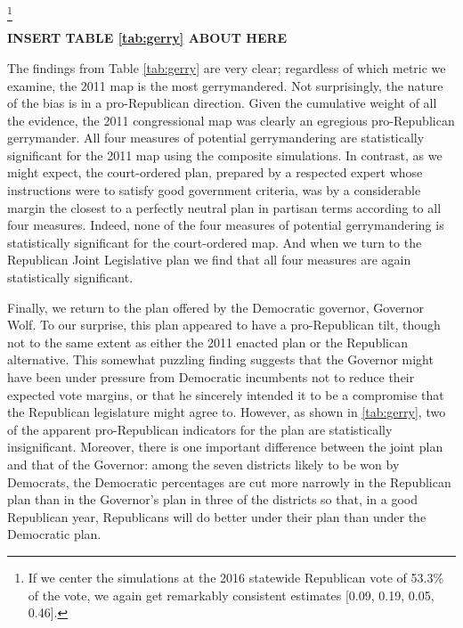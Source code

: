         \footnote{If we center the simulations at the 2016 statewide Republican vote of 53.3\% of the vote, we again get remarkably consistent estimates [0.09, 0.19, 0.05, 0.46].}
%
    
        \begin{center}\textbf{INSERT TABLE \ref{tab:gerry} ABOUT HERE} \end{center}
\par
    The findings from Table \ref{tab:gerry} are very clear; regardless of which metric we examine, the 2011 map is the most gerrymandered. Not surprisingly, the nature of the bias is in a pro-Republican direction. Given the cumulative weight of all the evidence, the 2011 congressional map was clearly an egregious pro-Republican gerrymander. All four measures of potential gerrymandering are statistically significant for the 2011 map using the composite simulations. In contrast, as we might expect, the court-ordered plan, prepared by a respected expert whose instructions were to satisfy good government criteria, was by a considerable margin the closest to a perfectly neutral plan in partisan terms according to all four measures. Indeed, none of the four measures of potential gerrymandering is statistically significant for the court-ordered map. And when we turn to the Republican Joint Legislative plan we find that all four measures are again statistically significant.  
\par
    Finally, we return to the plan offered by the Democratic governor, Governor Wolf. To our surprise, this plan appeared to have a pro-Republican tilt, though not to the same extent as either the 2011 enacted plan or the Republican alternative. This somewhat puzzling finding suggests that the Governor might have been under pressure from Democratic incumbents not to reduce their expected vote margins, or that he sincerely intended it to be a compromise that the Republican legislature might agree to. However, as shown in \ref{tab:gerry}, two of the apparent pro-Republican indicators for the plan are statistically insignificant. Moreover, there is one important difference between the joint plan and that of the Governor: among the seven districts likely to be won by Democrats, the Democratic percentages are cut more narrowly in the Republican plan than in the Governor’s plan in three of the districts so that, in a good Republican year, Republicans will do better under their plan than under the Democratic plan.
